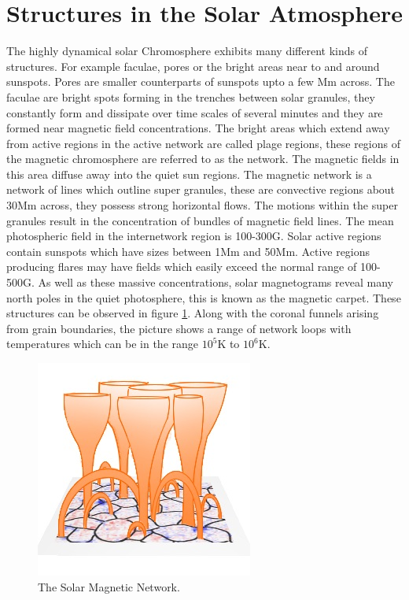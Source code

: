 \documentclass[twocolumn]{aastex62}
\begin{document}
\section{Structures in the Solar Atmosphere } \label{sec:structures}
The highly dynamical solar Chromosphere exhibits many different kinds of structures. For example faculae, pores or the bright areas near to and around sunspots. Pores are smaller counterparts of sunspots upto a few Mm across. The faculae are bright spots forming in the trenches between solar granules, they constantly form and dissipate over time scales of several minutes and they are formed near magnetic field concentrations.   The bright areas which extend away from active regions in the active network are called plage regions, these regions of the magnetic chromosphere are referred to as the network. The magnetic fields in this area diffuse away into the quiet sun regions. The magnetic network is a network of lines which outline super granules, these are convective regions about 30Mm across, they possess strong horizontal flows. The motions within the super granules result in the concentration of bundles of magnetic field lines.  The mean photospheric field in the internetwork region is 100-300G.  Solar active regions contain sunspots which have sizes between 1Mm and 50Mm. Active regions producing flares may have fields which easily exceed the normal range of 100-500G. As well as these massive concentrations, solar magnetograms reveal many north poles in the quiet photosphere, this is known as the magnetic carpet. These structures can be observed in figure \ref{magneticnetwork}. Along with the coronal funnels arising from grain boundaries, the picture shows a range of network loops with temperatures which can be in the range $10^{5}$K to $10^{6}$K.


\begin{figure}[h]\label{magneticnetwork}
\centering
\includegraphics[scale=1.0]{imrescale/solar-network-v1.jpg}
\caption{The Solar Magnetic Network.}
\end{figure}
\end{document}
